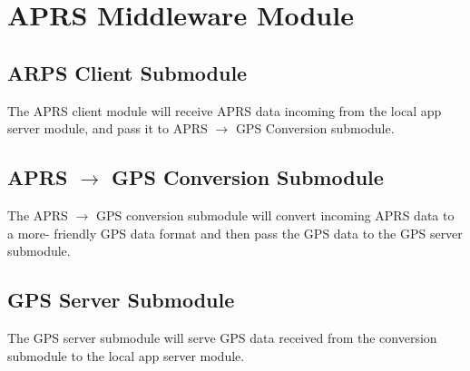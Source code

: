 \section{APRS Middleware Module}

\subsection{ARPS Client Submodule}
The APRS client module will receive APRS data incoming from the local app server module,
and pass it to APRS $\rightarrow$ GPS Conversion submodule.

\subsection{APRS $\rightarrow$ GPS Conversion Submodule}
The APRS $\rightarrow$ GPS conversion submodule will convert incoming APRS data to a more-
friendly GPS data format and then pass the GPS data to the GPS server submodule.

\subsection{GPS Server Submodule}
The GPS server submodule will serve GPS data received from the conversion submodule
to the local app server module.
